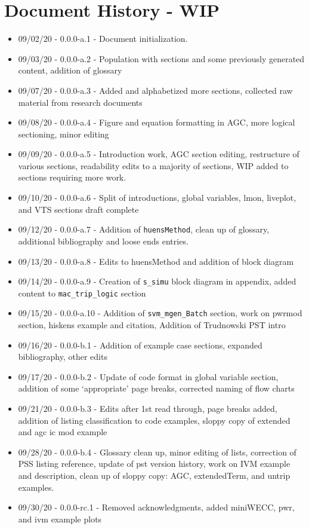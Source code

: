 \chapter{Document History  - WIP}

\begin{itemize}
\itemsep 0em
\item 09/02/20 - 0.0.0-a.1 - Document initialization.
\item 09/03/20 - 0.0.0-a.2 - Population with sections and some previously generated content, addition of glossary
\item 09/07/20 - 0.0.0-a.3 - Added and alphabetized more sections, collected raw material from research documents
\item 09/08/20 - 0.0.0-a.4 - Figure and equation formatting in AGC, more logical sectioning, minor editing
\item 09/09/20 - 0.0.0-a.5 - Introduction work, AGC section editing, restructure of various sections, readability edits to a majority of sections, WIP added to sections requiring more work.
\item 09/10/20 - 0.0.0-a.6 - Split of introductions, global variables, lmon, liveplot, and VTS sections draft complete
\item 09/12/20 - 0.0.0-a.7 - Addition of \verb|huensMethod|, clean up of glossary, additional bibliography and loose ends entries.
\item 09/13/20 - 0.0.0-a.8 - Edits to huensMethod and addition of block diagram 
\item 09/14/20 - 0.0.0-a.9 - Creation of \verb|s_simu| block diagram in appendix, added content to \verb|mac_trip_logic| section
\item 09/15/20 - 0.0.0-a.10 - Addition of \verb|svm_mgen_Batch| section, work on pwrmod section, hiskens example and citation, Addition of Trudnowski PST intro
\item 09/16/20 - 0.0.0-b.1 - Addition of example case sections, expanded bibliography, other edits 
\item 09/17/20 - 0.0.0-b.2 - Update of code format in global variable section, addition of some `appropriate' page breaks, corrected naming of flow charts
\item 09/21/20 - 0.0.0-b.3 - Edits after 1st read through, page breaks added, addition of listing classification to code examples, sloppy copy of extended and agc ic mod example
\item 09/28/20 - 0.0.0-b.4 - Glossary clean up, minor editing of lists, correction of PSS listing reference, update of pst version history, work on IVM example and description, clean up of sloppy copy: AGC, extendedTerm, and untrip examples.
\item 09/30/20 - 0.0.0-rc.1 - Removed acknowledgments, added miniWECC, pwr, and ivm example plots
\end{itemize}